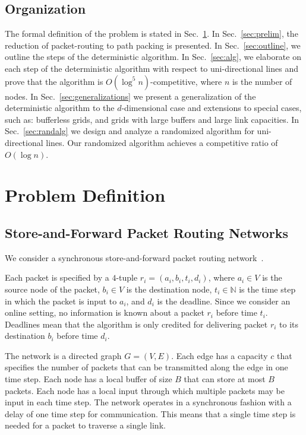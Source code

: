 \documentclass[11pt]{article}
\newenvironment{proof sketch}[1]{\noindent {\emph{Proof sketch of #1:}}}{\hfill \qed}
\begin{document}
\subsection{Organization}
The formal definition of the problem is stated in Sec.~\ref{sec:problem}.
In Sec.~\ref{sec:prelim}, the reduction of packet-routing to path packing is presented.
In Sec.~\ref{sec:outline}, we outline the steps of the deterministic algorithm.
In Sec.~\ref{sec:alg}, we elaborate on each step of the deterministic algorithm with respect to uni-directional lines and prove that the algorithm is $O(\log^5 n)$-competitive, where $n$ is the number of nodes. In Sec.~\ref{sec:generalizations} we present a
generalization of the deterministic algorithm to the
$d$-dimensional case and extensions to special cases, such
as: bufferless grids, and grids with large buffers and
large link capacities. In Sec.~\ref{sec:randalg} we design
and analyze a randomized algorithm for uni-directional
lines. Our randomized algorithm achieves a competitive
ratio of $O(\log n)$.


\section{Problem Definition}\label{sec:problem}
\label{sect:problem}

\subsection{Store-and-Forward Packet Routing Networks}
We consider a synchronous store-and-forward packet
routing network~\cite{AKOR,AKK,AZ}.

Each packet is specified by a $4$-tuple $r_i=(a_i,b_i,t_i,d_i)$, where $a_i\in V$ is the source node of the packet, $b_i\in V$ is the destination node,  $t_i\in \mathbb{N}$ is the time step in which the packet is input to $a_i$, and $d_i$ is the deadline.  Since we consider an online setting, no information is known about a packet $r_i$ before time $t_i$.  Deadlines mean that the algorithm is only credited for delivering packet $r_i$ to its destination $b_i$ before time $d_i$.

The network is a directed graph $G=(V,E)$.
Each edge has a capacity $c$ that specifies the number of packets that can be transmitted along the edge in one time step.  Each node has a local buffer of size $B$ that can store at most $B$ packets.
Each node has a local input through which multiple packets may be input in each time step.  The network operates in a synchronous fashion with a delay of one time step for communication. This means that a single time step is needed for a packet to traverse a single link.
\end{document}
